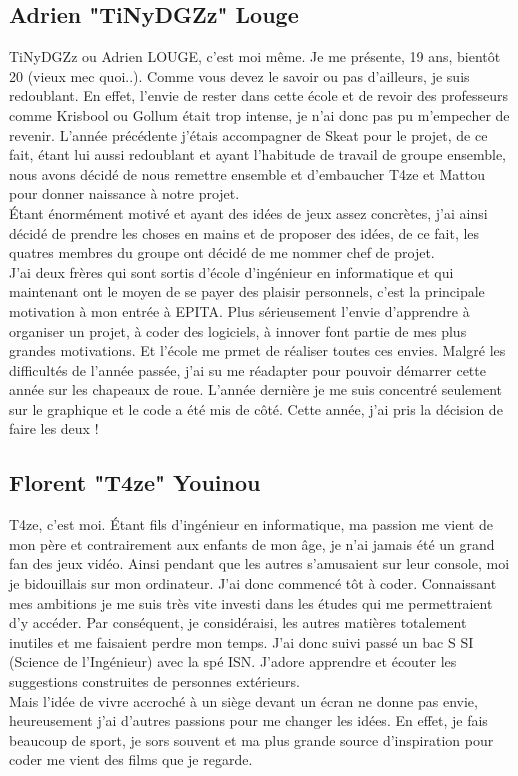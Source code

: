 \documentclass [11pt]{report}
\begin{document}
		\subsection {Adrien "TiNyDGZz" Louge}
			TiNyDGZz ou Adrien LOUGE, c'est moi même. Je me présente, 19 ans, bientôt 20 (vieux mec quoi..). Comme vous devez le savoir ou pas d'ailleurs, je suis redoublant. En effet, l'envie de rester dans cette école et de revoir des professeurs comme Krisbool ou Gollum était trop intense, je n'ai donc pas pu m'empecher de 				revenir. L'année précédente j'étais accompagner de Skeat pour le projet, de ce fait, étant lui aussi redoublant et ayant l'habitude de travail de groupe ensemble, nous avons décidé de nous remettre ensemble et d'embaucher T4ze et Mattou pour donner naissance à notre projet.\\
			\indent Étant énormément motivé et ayant des idées de jeux assez concrètes, j'ai ainsi décidé de prendre les choses en mains et de proposer des idées, de ce fait, les quatres membres du groupe ont décidé de me nommer chef de projet.\\
			\indent J'ai deux frères qui sont sortis d'école d'ingénieur en informatique et qui maintenant ont le moyen de se payer des plaisir personnels, c'est la principale motivation à mon entrée à EPITA. Plus sérieusement l'envie d'apprendre à organiser un projet, à coder des logiciels, à innover font partie de mes plus grandes 				motivations. Et l'école me prmet de réaliser toutes ces envies. Malgré les difficultés de l'année passée, j'ai su me réadapter pour pouvoir démarrer cette année sur les chapeaux de roue. L'année dernière je me suis concentré seulement sur le graphique et le code a été mis de côté. Cette année, j'ai pris la décision de faire les deux !\\\vspace{2mm}
	

		\subsection {Florent "T4ze" Youinou}
			T4ze, c’est moi. \'Etant fils d’ingénieur en informatique, ma passion me vient de mon père et contrairement aux enfants de mon âge, je n’ai jamais été un grand fan des jeux vidéo. Ainsi pendant que les autres s’amusaient sur leur console, moi je bidouillais sur mon ordinateur. J’ai donc commencé tôt à coder. Connaissant mes 			ambitions je me suis très vite investi dans les études qui me permettraient d’y accéder. Par conséquent, je considéraisi, les autres matières totalement inutiles et me faisaient perdre mon temps. J’ai donc suivi passé un bac S SI (Science de l’Ingénieur) avec la spé ISN. J’adore apprendre et écouter les suggestions 						construites de personnes extérieurs.\\
			\indent Mais l’idée de vivre accroché à un siège devant un écran ne donne pas envie, heureusement j’ai d’autres passions pour me changer les idées. En effet, je fais beaucoup de sport, je sors souvent et ma plus grande source d’inspiration pour coder me vient des films que je regarde.\\
\vspace{10mm}
\end{document}
